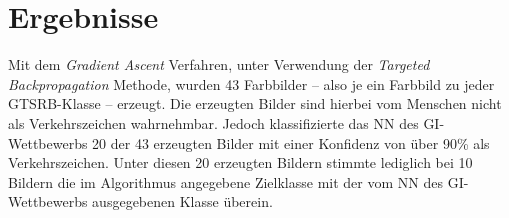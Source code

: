 %
%
%
%
%
%


\section{Ergebnisse}
Mit dem \textit{Gradient Ascent} Verfahren, unter Verwendung der \textit{Targeted Backpropagation} Methode, wurden 43 Farbbilder – also je ein Farbbild zu jeder \ac{GTSRB}-Klasse – erzeugt. 
Die erzeugten Bilder sind hierbei vom Menschen nicht als Verkehrszeichen wahrnehmbar. Jedoch klassifizierte das \ac{NN} des \ac{GI}-Wettbewerbs 20 der 43 erzeugten Bilder mit einer Konfidenz von über 90\% als Verkehrszeichen. 
Unter diesen 20 erzeugten Bildern stimmte lediglich bei 10 Bildern die im Algorithmus angegebene Zielklasse mit der vom \ac{NN} des \ac{GI}-Wettbewerbs ausgegebenen Klasse überein.




